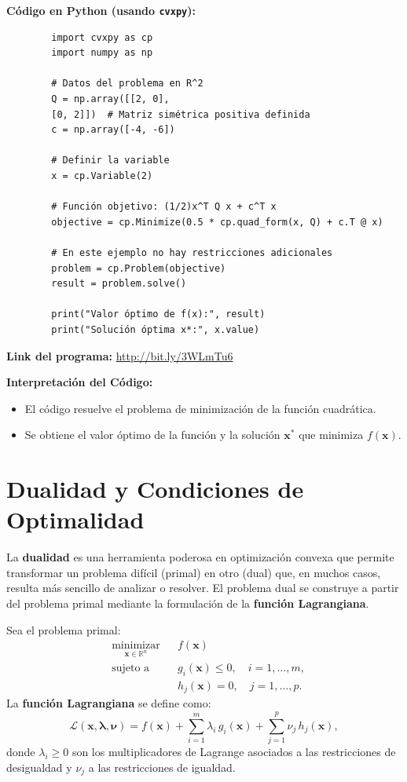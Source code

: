\documentclass[12pt,a4,oneside]{book}
\begin{document}
	\textbf{Código en Python (usando \texttt{cvxpy}):}
	\begin{verbatim}
		import cvxpy as cp
		import numpy as np
		
		# Datos del problema en R^2
		Q = np.array([[2, 0],
		[0, 2]])  # Matriz simétrica positiva definida
		c = np.array([-4, -6])
		
		# Definir la variable
		x = cp.Variable(2)
		
		# Función objetivo: (1/2)x^T Q x + c^T x
		objective = cp.Minimize(0.5 * cp.quad_form(x, Q) + c.T @ x)
		
		# En este ejemplo no hay restricciones adicionales
		problem = cp.Problem(objective)
		result = problem.solve()
		
		print("Valor óptimo de f(x):", result)
		print("Solución óptima x*:", x.value)
	\end{verbatim}
	
	\textbf{Link del programa:} \url{http://bit.ly/3WLmTu6}
	
	\textbf{Interpretación del Código:}  
	\begin{itemize}
		\item El código resuelve el problema de minimización de la función cuadrática.
		\item Se obtiene el valor óptimo de la función y la solución \(\mathbf{x}^*\) que minimiza \(f(\mathbf{x})\).
	\end{itemize}
	
	\section{Dualidad y Condiciones de Optimalidad}
	
	La \textbf{dualidad} es una herramienta poderosa en optimización convexa que permite transformar un problema difícil (primal) en otro (dual) que, en muchos casos, resulta más sencillo de analizar o resolver. El problema dual se construye a partir del problema primal mediante la formulación de la \textbf{función Lagrangiana}.
	
	Sea el problema primal:
	\[
	\begin{aligned}
		& \underset{\mathbf{x} \in \mathbb{R}^n}{\text{minimizar}}
		& & f(\mathbf{x}) \\
		& \text{sujeto a}
		& & g_i(\mathbf{x}) \leq 0, \quad i = 1, \ldots, m, \\
		& & & h_j(\mathbf{x}) = 0, \quad j = 1, \ldots, p.
	\end{aligned}
	\]
	La \textbf{función Lagrangiana} se define como:
	\[
	\mathcal{L}(\mathbf{x}, \boldsymbol{\lambda}, \boldsymbol{\nu}) = f(\mathbf{x}) + \sum_{i=1}^{m} \lambda_i \, g_i(\mathbf{x}) + \sum_{j=1}^{p} \nu_j \, h_j(\mathbf{x}),
	\]
	donde \(\lambda_i \geq 0\) son los multiplicadores de Lagrange asociados a las restricciones de desigualdad y \(\nu_j\) a las restricciones de igualdad.
	
\end{document}
